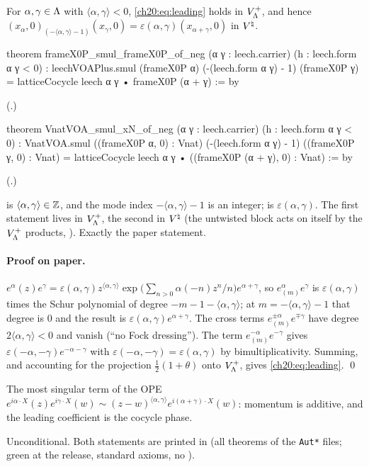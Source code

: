 \begin{lemma}\label{ch20:lem:leading}
For $\alpha,\gamma\in{\Lambda}$ with $\langle\alpha,\gamma\rangle<0$, \eqref{ch20:eq:leading} holds in $V_{\Lambda}^{+}$, and
hence $(x_\alpha,0)_{(-\langle\alpha,\gamma\rangle-1)}(x_\gamma,0)=\varepsilon(\alpha,\gamma)(x_{\alpha+\gamma},0)$ in ${V^{\natural}}$.
\end{lemma}
\begin{leancode}
theorem frameX0P_smul_frameX0P_of_neg (α γ : leech.carrier) (h : leech.form α γ < 0) :
    leechVOAPlus.smul (frameX0P α) (-(leech.form α γ) - 1) (frameX0P γ)
      = latticeCocycle leech α γ • frameX0P (α + γ) := by
\end{leancode}
(.)
\begin{leancode}
theorem VnatVOA_smul_xN_of_neg (α γ : leech.carrier) (h : leech.form α γ < 0) :
    VnatVOA.smul ((frameX0P α, 0) : Vnat) (-(leech.form α γ) - 1) ((frameX0P γ, 0) : Vnat)
      = latticeCocycle leech α γ • ((frameX0P (α + γ), 0) : Vnat) := by
\end{leancode}
(.)
\begin{dictionary}
 is $\langle\alpha,\gamma\rangle\in{\mathbb{Z}}$, and the mode index $-\langle\alpha,\gamma\rangle-1$ is an
integer;  is $\varepsilon(\alpha,\gamma)$.  The first statement lives in $V_{\Lambda}^{+}$, the
second in ${V^{\natural}}$ (the untwisted block acts on itself by the $V_{\Lambda}^{+}$ products, ).  Exactly
the paper statement.
\end{dictionary}
\paragraph{Proof on paper.}  $e^\alpha(z)e^\gamma=\varepsilon(\alpha,\gamma)z^{\langle\alpha,\gamma\rangle}\exp\bigl(\sum_{n>0}
\alpha(-n)z^n/n\bigr)e^{\alpha+\gamma}$, so $e^\alpha_{(m)}e^\gamma$ is $\varepsilon(\alpha,\gamma)$ times the Schur polynomial of
degree $-m-1-\langle\alpha,\gamma\rangle$; at $m=-\langle\alpha,\gamma\rangle-1$ that degree is $0$ and the result is
$\varepsilon(\alpha,\gamma)e^{\alpha+\gamma}$.  The cross terms $e^{\pm\alpha}_{(m)}e^{\mp\gamma}$ have degree $2\langle\alpha,\gamma\rangle<0$
and vanish (``no Fock dressing'').  The term $e^{-\alpha}_{(m)}e^{-\gamma}$ gives $\varepsilon(-\alpha,-\gamma)e^{-\alpha-\gamma}$ with
$\varepsilon(-\alpha,-\gamma)=\varepsilon(\alpha,\gamma)$ by bimultiplicativity.  Summing, and accounting for the projection
$\tfrac12(1+\theta)$ onto $V_{\Lambda}^{+}$, gives \eqref{ch20:eq:leading}. \qed
\begin{physics}
The most singular term of the OPE $e^{i\alpha\cdot X}(z)e^{i\gamma\cdot X}(w)\sim(z-w)^{\langle\alpha,\gamma\rangle}e^{i(\alpha+\gamma)\cdot X}(w)$:
momentum is additive, and the leading coefficient is the cocycle phase.
\end{physics}
\begin{status}
Unconditional.  Both statements are printed in  (all theorems of the \texttt{Aut*} files; green at the release, standard axioms, no ).
\end{status}

